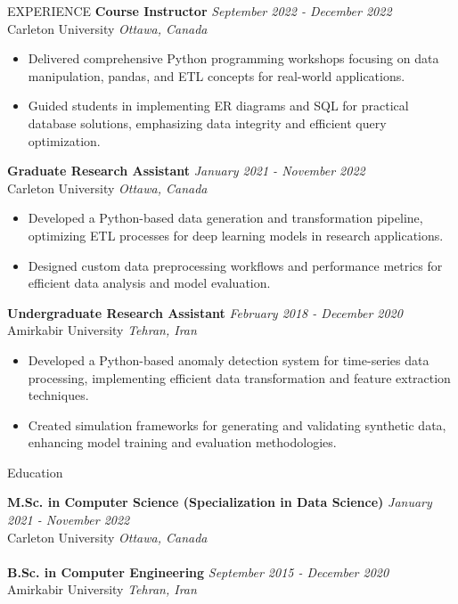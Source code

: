 \documentclass{resume}
\begin{document}
\begin{rSection}{EXPERIENCE}
\textbf{Course Instructor} \hfill \textit{September 2022 - December 2022}\\
Carleton University \hfill \textit{Ottawa, Canada}
 \begin{itemize}
    \itemsep -3pt {} 
    \item Delivered comprehensive Python programming workshops focusing on data manipulation, pandas, and ETL concepts for real-world applications.
    \item Guided students in implementing ER diagrams and SQL for practical database solutions, emphasizing data integrity and efficient query optimization.
 \end{itemize}

\textbf{Graduate Research Assistant} \hfill \textit{January 2021 - November 2022}\\
Carleton University \hfill \textit{Ottawa, Canada}
 \begin{itemize}
    \itemsep -3pt {} 
    \item Developed a Python-based data generation and transformation pipeline, optimizing ETL processes for deep learning models in research applications.
    \item Designed custom data preprocessing workflows and performance metrics for efficient data analysis and model evaluation.
 \end{itemize}

\textbf{Undergraduate Research Assistant} \hfill \textit{February 2018 - December 2020}\\
Amirkabir University \hfill \textit{Tehran, Iran}
 \begin{itemize}
    \itemsep -3pt {} 
    \item Developed a Python-based anomaly detection system for time-series data processing, implementing efficient data transformation and feature extraction techniques.
    \item Created simulation frameworks for generating and validating synthetic data, enhancing model training and evaluation methodologies.
 \end{itemize}

\end{rSection}

\begin{rSection}{Education}

{\bf M.Sc. in Computer Science (Specialization in Data Science)}  \hfill {\textit{January 2021 - November 2022}}\\
{Carleton University} \hfill \textit{Ottawa, Canada}
\\
\\
{\bf B.Sc. in Computer Engineering} \hfill {\textit{September 2015 - December 2020}}\\
Amirkabir University \hfill \textit{Tehran, Iran}

\end{rSection}
\end{document}
